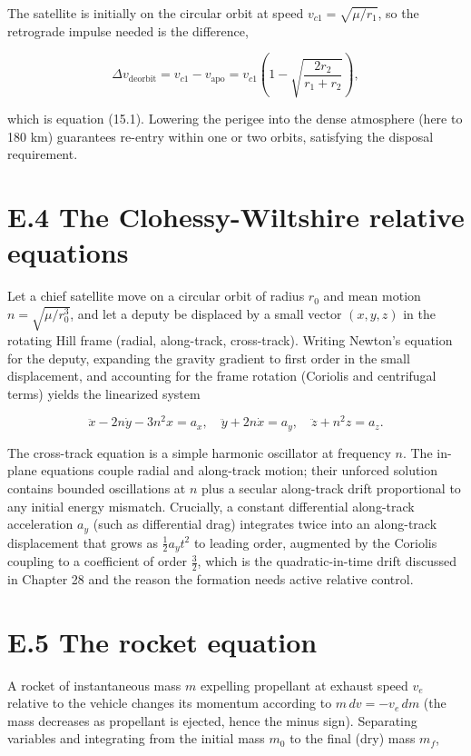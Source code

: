 \documentclass[
  11pt,
  openany,
  oneside]{book}
\begin{document}
The satellite is initially on the circular orbit at speed
\(v_{c1} = \sqrt{\mu/r_1}\), so the retrograde impulse needed is the
difference,

\[\Delta v_{\mathrm{deorbit}} = v_{c1} - v_{\mathrm{apo}} = v_{c1}\left(1 - \sqrt{\frac{2 r_2}{r_1 + r_2}}\right),\]

which is equation (15.1). Lowering the perigee into the dense atmosphere
(here to 180 km) guarantees re-entry within one or two orbits,
satisfying the disposal requirement.

\section{E.4 The Clohessy-Wiltshire relative
equations}\label{e.4-the-clohessy-wiltshire-relative-equations}

Let a chief satellite move on a circular orbit of radius \(r_0\) and
mean motion \(n = \sqrt{\mu/r_0^3}\), and let a deputy be displaced by a
small vector \((x, y, z)\) in the rotating Hill frame (radial,
along-track, cross-track). Writing Newton's equation for the deputy,
expanding the gravity gradient to first order in the small displacement,
and accounting for the frame rotation (Coriolis and centrifugal terms)
yields the linearized system

\[\ddot x - 2 n \dot y - 3 n^2 x = a_x, \quad \ddot y + 2 n \dot x = a_y, \quad \ddot z + n^2 z = a_z.\]

The cross-track equation is a simple harmonic oscillator at frequency
\(n\). The in-plane equations couple radial and along-track motion;
their unforced solution contains bounded oscillations at \(n\) plus a
secular along-track drift proportional to any initial energy mismatch.
Crucially, a constant differential along-track acceleration \(a_y\)
(such as differential drag) integrates twice into an along-track
displacement that grows as \(\tfrac{1}{2} a_y t^2\) to leading order,
augmented by the Coriolis coupling to a coefficient of order
\(\tfrac{3}{2}\), which is the quadratic-in-time drift discussed in
Chapter 28 and the reason the formation needs active relative control.

\section{E.5 The rocket equation}\label{e.5-the-rocket-equation}

A rocket of instantaneous mass \(m\) expelling propellant at exhaust
speed \(v_e\) relative to the vehicle changes its momentum according to
\(m\, dv = -v_e\, dm\) (the mass decreases as propellant is ejected,
hence the minus sign). Separating variables and integrating from the
initial mass \(m_0\) to the final (dry) mass \(m_f\),
\end{document}
